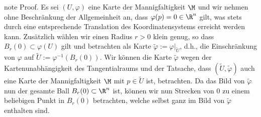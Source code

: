 \documentclass[letterpaper,10pt,english]{jupyterBook}
\begin{document}
\begin{sphinxadmonition}{note}
\sphinxAtStartPar
Proof. Es sei \((U,\varphi)\) eine Karte der Mannigfaltigkeit \(\M\) und wir nehmen ohne Beschränkung der Allgemeinheit an, dass \(\varphi(p)=0 \in \R^n\) gilt, was stets durch eine entsprechende Translation des Koordinatensystems erreicht werden kann.
Zusätzlich wählen wir einen Radius \(r>0\) klein genug, so dass \(B_r(0) \subset \varphi(U)\) gilt und betrachten als Karte \(\tilde{\varphi} := \varphi\rvert_{\tilde{U}}\), d.h., die Einschränkung von \(\varphi\) auf \(\tilde{U}:= \varphi^{-1}(B_r(0))\).
Wir können die Karte \(\tilde{\varphi}\) wegen der Kartenunabhängigkeit des Tangentialraums und der Tatsache, dass \((\tilde{U},\tilde{\varphi})\) auch eine Karte der Mannigfaltigkeit \(\M\) mit \(p\in \tilde{U}\) ist, betrachten.
Da das Bild von \(\tilde{\varphi}\) nun der gesamte Ball \(B_r(0) \subset \R^n\) ist, können wir nun Strecken von \(0\) zu einem beliebigen Punkt in \(B_r(0)\) betrachten, welche selbst ganz im Bild von \(\tilde{\varphi}\) enthalten sind.


\end{sphinxadmonition}
\end{document}
